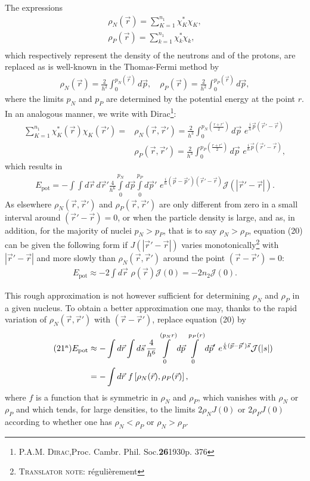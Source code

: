 \documentclass[a4paper,11pt]{article}
\newcommand{\?}[2]{#1\footnote{\textsc{Translator note}: #2}}
\newcommand{\nequ}[2]{\begin{align*}\tag{#1}#2\end{align*}}
\renewcommand{\exp}[1]{e^{#1}}
\newcommand{\citeauthor}[1]{\textsc{#1}}
\newcommand{\citepub}[1]{#1}
\newcommand{\citevol}[1]{\textbf{#1}}
\newcommand{\citepage}[1]{#1}
\newcommand{\citeyear}[1]{#1}
\begin{document}
{{The expressions
\nequ{17}{
\rho_N(\vec{r}) = \sum\limits_{K=1}^{n_1}\chi_K^*\chi_K,\\
\rho_P(\vec{r}) = \sum\limits_{k=1}^{n_1}\chi_k^*\chi_k,\\
}
which respectively represent the density of the neutrons and of the protons, are replaced as is well-known in the Thomas-Fermi method by
\nequ{18}{
\rho_N(\vec{r}) = \frac{2}{h^2}\int_0^{p_N(\vec{r})}d\vec{p},\quad
\rho_P(\vec{r}) = \frac{2}{h^2}\int_0^{p_P(\vec{r})}d\vec{p},
}
where the limits $p_N$ and $p_P$ are determined by the potential energy at the point $r$. In an analogous manner, we write with Dirac\footnote{\citeauthor{P.A.M. Dirac},\citepub{Proc. Cambr. Phil. Soc.}\citevol{26}\citeyear{1930}\citepage{p. 376}}:
\nequ{19}{
\sum\limits_{K=1}^{n_1}\chi_K^*(\vec{r})\chi_K(\vec{r}') = & \rho_N\left(\vec{r}, \vec{r}'\right) = \frac{2}{h^3}\int_0^{p_N\left(\frac{r+r'}{2}\right)}d\vec{p}\,\,
\exp{\frac{i}{h}\vec{p}\left(\vec{r}'-\vec{r}\right)}\\
& \rho_P\left(\vec{r}, \vec{r}'\right) = \frac{2}{h^3}\int_0^{p_P\left(\frac{r+r'}{2}\right)}d\vec{p}\,\,
\exp{\frac{i}{\hbar}\vec{p}\left(\vec{r}'-\vec{r}\right)},
}
which results in
\nequ{20}{
E_\text{pot} = -\int\int d\vec{r}\,d\vec{r}'\frac{4}{h^6}\int\limits_0^{p_N}d\vec{p}\int\limits_0^{p_P}d\vec{p}'\,\,
\exp{\frac{i}{\hbar}\left(\vec{p} - \vec{p}'\right)\left(\vec{r}' - \vec{r}\right)}\mathcal{J}\left(\left|\vec{r}'-\vec{r}\right|\right).
}
As elsewhere $\rho_N\left(\vec{r}, \vec{r}'\right)$ and $\rho_P\left(\vec{r}, \vec{r}'\right)$ are only different from zero in a small interval around $\left(\vec{r}' - \vec{r}\right) = 0$, or when the particle density is large, and as, in addition, for the majority of nuclei $p_N>p_P$, that is to say $\rho_N>\rho_P$, equation (20) can be given the following form if $J\left(\left|\vec{r}'-\vec{r}\right|\right)$ varies \?{monotonically}{régulièrement} with $\left|\vec{r}'-\vec{r}\right|$ and more slowly than $\rho_N\left(\vec{r}, \vec{r}'\right)$ around the point $\left(\vec{r}-\vec{r}'\right)=0$:
\nequ{21}{
E_\text{pot} \approx -2\int d\vec{r}\,\,\rho(\vec{r})\mathcal{J}(0) = -2n_2 \mathcal{J}(0).
}

This rough approximation is not however sufficient for determining $\rho_N$ and $\rho_P$ in a given nucleus. To obtain a better approximation one may, thanks to the rapid variation of $\rho_N(\vec{r}, \vec{r}')$ with $(\vec{r} - \vec{r}')$, replace equation (20) by
\nequ{$21^\text{a}$}{
E_\text{pot} &\approx -\int d\vec{r} \int d\vec{s}\,\frac{4}{h^6}
\int\limits_0^{(p_N r)}d\vec{p} \int\limits_0^{p_P(r)}d\vec{p}'\,\,
\exp{\frac{i}{\hbar}(\vec{p} - \vec{p}')\vec{s}}\mathcal{J}(|s|)\\
&= -\int d\vec{r}\,\,f\left[\rho_N(\vec{r}), \rho_P(\vec{r})\right],
}
where $f$ is a function that is symmetric in $\rho_N$ and $\rho_P$, which vanishes with $\rho_N$ or $\rho_P$ and which tends, for large densities, to the limits $2\rho_N J(0)$ or $2\rho_P J(0)$ according to whether one has $\rho_N < \rho_P$ or $\rho_N > \rho_P$.

}}
\end{document}
